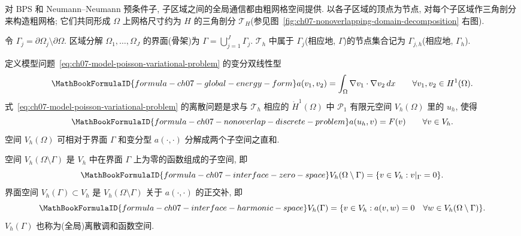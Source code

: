 对 BPS 和 Neumann--Neumann 预条件子, 子区域之间的全局通信都由粗网格空间提供. 以各子区域的顶点为节点, 对每个子区域作三角剖分来构造粗网格; 它们共同形成 $\Omega$ 上网格尺寸约为 $H$ 的三角剖分 $\mathcal T_H$(参见图~\ref{fig:ch07-nonoverlapping-domain-decomposition} 右图).

\begin{Definition}[界面]
\label{def:ch07-domain-decomposition-interface}
令 $\Gamma_j=\partial\Omega_j\setminus\partial\Omega$. 区域分解 $\Omega_1,\ldots,\Omega_J$ 的界面(骨架)为 $\Gamma=\bigcup_{j=1}^{J}\Gamma_j$. $\mathcal T_h$ 中属于 $\Gamma_j$(相应地, $\Gamma$)的节点集合记为 $\Gamma_{j,h}$(相应地, $\Gamma_h$).
\end{Definition}

定义模型问题~\eqref{eq:ch07-model-poisson-variational-problem} 的变分双线性型
\begin{equation}
\MathBookFormulaID{formula-ch07-global-energy-form}
\label{eq:ch07-global-energy-form}
a(v_1,v_2)=\int_\Omega\nabla v_1\cdot\nabla v_2\,dx
\qquad\forall v_1,v_2\in H^1(\Omega).
\end{equation}
式~\eqref{eq:ch07-model-poisson-variational-problem} 的离散问题是求与 $\mathcal T_h$ 相应的 $\mathring H^1(\Omega)$ 中 $\mathcal P_1$ 有限元空间 $V_h(\Omega)$ 里的 $u_h$, 使得
\begin{equation}
\MathBookFormulaID{formula-ch07-nonoverlap-discrete-problem}
\label{eq:ch07-nonoverlap-discrete-problem}
a(u_h,v)=F(v)
\qquad\forall v\in V_h.
\end{equation}
空间 $V_h(\Omega)$ 可相对于界面 $\Gamma$ 和变分型 $a(\cdot,\cdot)$ 分解成两个子空间之直和.

\begin{Definition}[内部空间]
\label{def:ch07-interface-zero-space}
空间 $V_h(\Omega\setminus\Gamma)$ 是 $V_h$ 中在界面 $\Gamma$ 上为零的函数组成的子空间, 即
\begin{equation}
\MathBookFormulaID{formula-ch07-interface-zero-space}
\label{eq:ch07-interface-zero-space}
V_h(\Omega\setminus\Gamma)=\{v\in V_h:v|_\Gamma=0\}.
\end{equation}
界面空间 $V_h(\Gamma)\subset V_h$ 是 $V_h(\Omega\setminus\Gamma)$ 关于 $a(\cdot,\cdot)$ 的正交补, 即
\begin{equation}
\MathBookFormulaID{formula-ch07-interface-harmonic-space}
\label{eq:ch07-interface-harmonic-space}
V_h(\Gamma)=\{v\in V_h:a(v,w)=0
\quad\forall w\in V_h(\Omega\setminus\Gamma)\}.
\end{equation}
$V_h(\Gamma)$ 也称为(全局)离散调和函数空间.
\end{Definition}

